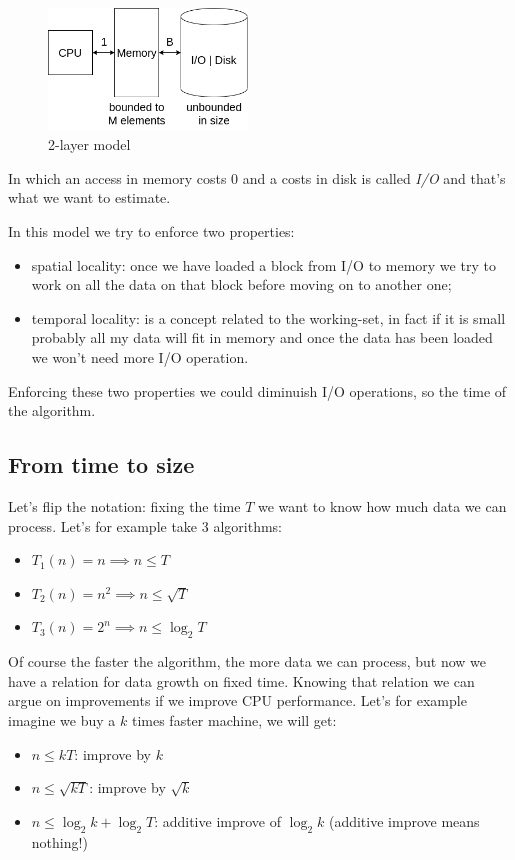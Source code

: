 \begin{figure}[H]
    \centering
    \includegraphics[width=200px]{images/1_Introduction/2-level_model.png}
    \caption{2-layer model}
\end{figure}

In which an access in memory costs 0 and a costs in disk is called \emph{I/O} and that's what we want to estimate.

In this model we try to enforce two properties:
\begin{itemize}
    \item spatial locality: once we have loaded a block from I/O to memory we try to work on all the data on that block before moving on to another one;
    \item temporal locality: is a concept related to the working-set, in fact if it is small probably all my data will fit in memory and once the data has been loaded we won't need more I/O operation.
\end{itemize}
Enforcing these two properties we could diminuish I/O operations, so the time of the algorithm.

\subsection{From time to size}
Let's flip the notation: fixing the time $T$ we want to know how much data we can process.
Let's for example take 3 algorithms:
\begin{itemize}
    \item $T_1(n) = n \implies n \leq T$
    \item $T_2(n) = n^2 \implies n \leq \sqrt{T}$
    \item $T_3(n) = 2^n \implies n \leq \log_2T$
\end{itemize}
Of course the faster the algorithm, the more data we can process, but now we have a relation for data growth on fixed time.
Knowing that relation we can argue on improvements if we improve CPU performance.
Let's for example imagine we buy a $k$ times faster machine, we will get:
\begin{itemize}
    \item $n \leq kT$: improve by $k$
    \item $n \leq \sqrt{kT}$: improve by $\sqrt{k}$
    \item $n \leq \log_2k + \log_2T$: additive improve of $\log_2k$ (additive improve means nothing!)
\end{itemize}


